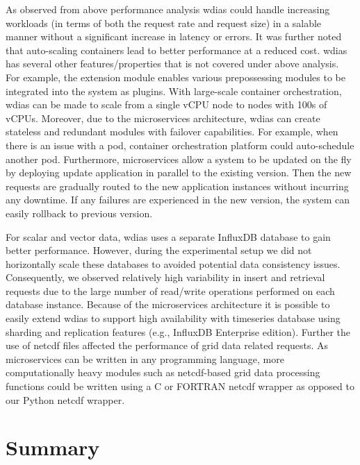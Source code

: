 \documentclass[conference]{IEEEtran}
\begin{document}
As observed from above performance analysis \acrshort{wdias} could handle increasing workloads (in terms of both the request rate and request size) in a salable manner without a significant increase in latency or errors. It was further noted that auto-scaling containers lead to better performance at a reduced cost. \acrshort{wdias} has several other features/properties that is not covered under above analysis. For example, the extension module enables various prepossessing modules to be integrated into the system as plugins.
With large-scale container orchestration, \acrshort{wdias} can be made to scale from a single vCPU node to nodes with 100s of vCPUs. Moreover, due to the microservices architecture, \acrshort{wdias} can create stateless and redundant modules with failover capabilities. For example, when there is an issue with a pod, container orchestration platform could auto-schedule another pod. Furthermore, microservices allow a system to be updated on the fly by deploying update application in parallel to the existing version. Then the new requests are gradually routed to the new application instances without incurring any downtime. If any failures are experienced in the new version, the system can easily rollback to previous version.

For scalar and vector data, \acrshort{wdias} uses a separate InfluxDB database to gain better performance. However, during the experimental setup we did not horizontally scale these databases to avoided potential data consistency issues. Consequently, we observed relatively high variability in insert and retrieval requests due to the large number of read/write operations performed on each database instance. Because of the microservices architecture it is possible to easily extend \acrshort{wdias} to support high availability with timeseries database using sharding and replication features (e.g., InfluxDB Enterprise edition). 
Further the use of \acrshort{netcdf} files affected the performance of grid data related requests. As microservices can be written in any programming language, more computationally heavy modules such as \acrshort{netcdf}-based grid data processing functions could be written using a C or FORTRAN \acrshort{netcdf} wrapper as opposed to our Python \acrshort{netcdf} wrapper.


\section{Summary}
\label{pse:summary}
\end{document}
